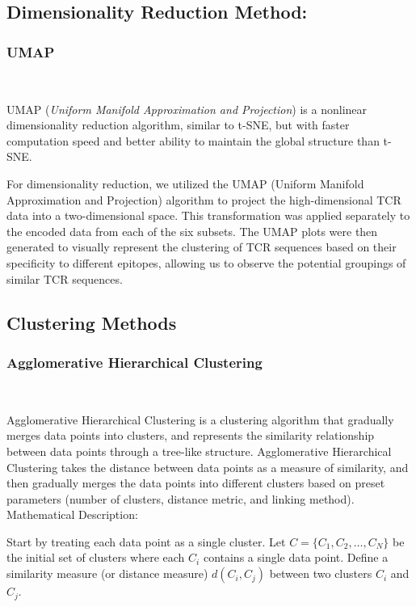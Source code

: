 \documentclass[conference]{IEEEtran}
\begin{document}
    \subsection{Dimensionality Reduction Method:}
	\subsubsection{UMAP} \
	
	UMAP (\emph{Uniform Manifold Approximation and Projection}) is a nonlinear dimensionality reduction algorithm, similar to t-SNE, but with faster computation speed and better ability to maintain the global structure than t-SNE.
	
	For dimensionality reduction, we utilized the UMAP (Uniform Manifold Approximation and Projection) algorithm to project the high-dimensional TCR data into a two-dimensional space. This transformation was applied separately to the encoded data from each of the six subsets. The UMAP plots were then generated to visually represent the clustering of TCR sequences based on their specificity to different epitopes, allowing us to observe the potential groupings of similar TCR sequences.
      
    \subsection{Clustering Methods}
	\subsubsection{Agglomerative Hierarchical Clustering} \
	
	Agglomerative Hierarchical Clustering is a clustering algorithm that gradually merges data points into clusters, and represents the similarity relationship between data points through a tree-like structure. Agglomerative Hierarchical Clustering takes the distance between data points as a measure of similarity, and then gradually merges the data points into different clusters based on preset parameters (number of clusters, distance metric, and linking method).
    \\
	
	Mathematical Description:
	
	Start by treating each data point as a single cluster. Let $C = \{C_1, C_2, \ldots, C_N\}$ be the initial set of clusters where each $C_i$ contains a single data point. Define a similarity measure (or distance measure) $d(C_i, C_j)$ between two clusters $C_i$ and $C_j$.
	
\end{document}
